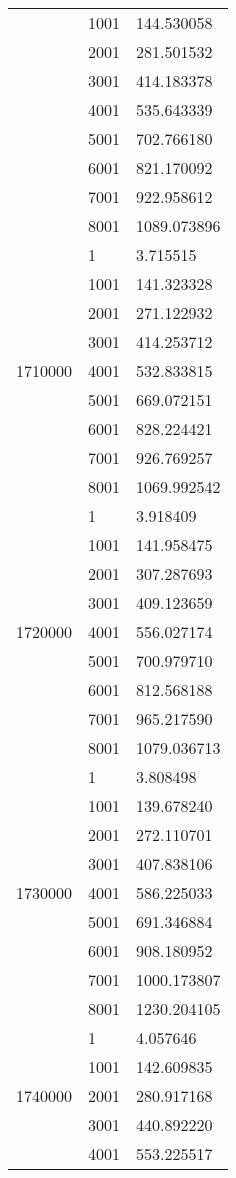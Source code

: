 \begin{table}[htb!]
\begin{tabular}{lll}
 & 1001 & 144.530058 \\
 & 2001 & 281.501532 \\
 & 3001 & 414.183378 \\
 & 4001 & 535.643339 \\
 & 5001 & 702.766180 \\
 & 6001 & 821.170092 \\
 & 7001 & 922.958612 \\
 & 8001 & 1089.073896 \\
\multirow[c]{9}{*}{1710000} & 1 & 3.715515 \\
 & 1001 & 141.323328 \\
 & 2001 & 271.122932 \\
 & 3001 & 414.253712 \\
 & 4001 & 532.833815 \\
 & 5001 & 669.072151 \\
 & 6001 & 828.224421 \\
 & 7001 & 926.769257 \\
 & 8001 & 1069.992542 \\
\multirow[c]{9}{*}{1720000} & 1 & 3.918409 \\
 & 1001 & 141.958475 \\
 & 2001 & 307.287693 \\
 & 3001 & 409.123659 \\
 & 4001 & 556.027174 \\
 & 5001 & 700.979710 \\
 & 6001 & 812.568188 \\
 & 7001 & 965.217590 \\
 & 8001 & 1079.036713 \\
\multirow[c]{9}{*}{1730000} & 1 & 3.808498 \\
 & 1001 & 139.678240 \\
 & 2001 & 272.110701 \\
 & 3001 & 407.838106 \\
 & 4001 & 586.225033 \\
 & 5001 & 691.346884 \\
 & 6001 & 908.180952 \\
 & 7001 & 1000.173807 \\
 & 8001 & 1230.204105 \\
\multirow[c]{9}{*}{1740000} & 1 & 4.057646 \\
 & 1001 & 142.609835 \\
 & 2001 & 280.917168 \\
 & 3001 & 440.892220 \\
 & 4001 & 553.225517 \\

\end{tabular}
\end{table}
